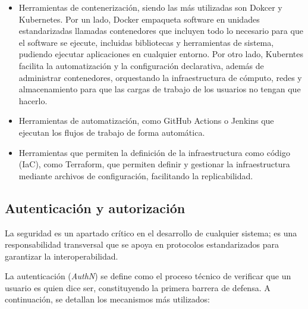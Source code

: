 \begin{itemize}
    \item Herramientas de contenerización, siendo las más utilizadas son Dokcer y Kubernetes. Por un lado, Docker 
    \cite{docker} empaqueta software en unidades estandarizadas llamadas contenedores que incluyen todo lo necesario 
    para que el software se ejecute, incluidas bibliotecas y herramientas de sistema, pudiendo ejecutar aplicaciones 
    en cualquier entorno. Por otro lado, Kuberntes \cite{kubernetes} facilita la automatización y la configuración 
    declarativa, además de administrar contenedores, orquestando la infraestructura de cómputo, redes y almacenamiento 
    para que las cargas de trabajo de los usuarios no tengan que hacerlo.
    \item Herramientas de automatización, como GitHub Actions o Jenkins que ejecutan los flujos de trabajo de forma automática.
    \item Herramientas que permiten la definición de la infraestructura como código (IaC), como Terraform, que permiten 
    definir y gestionar la infraestructura mediante archivos de configuración, facilitando la replicabilidad.
\end{itemize}

\subsection{Autenticación y autorización}

La seguridad es un apartado crítico en el desarrollo de cualquier sistema; es una responsabilidad transversal que se 
apoya en protocolos estandarizados para garantizar la interoperabilidad.

La autenticación (\textit{AuthN}) se define como el proceso técnico de verificar que un usuario es quien dice ser, 
constituyendo la primera barrera de defensa. A continuación, se detallan los mecanismos más utilizados:

